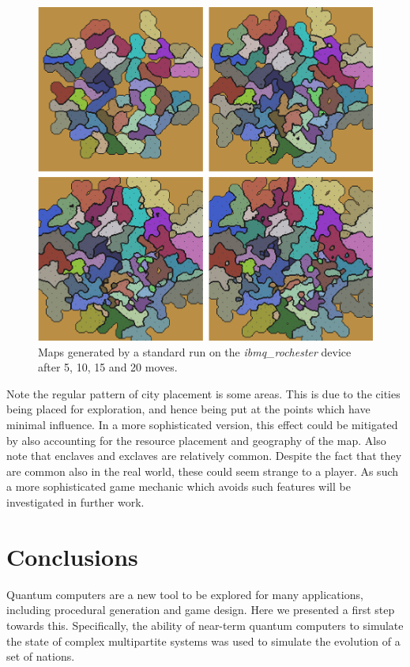 \documentclass[conference]{IEEEtran}
\begin{document}
\begin{figure}[htbp]
\begin{center}
\includegraphics[width=0.95\columnwidth]{figures/maps.png}
\caption{Maps generated by a standard run on the \textit{ibmq\_rochester} device after 5, 10, 15 and 20 moves.}
\label{maps}
\end{center}
\end{figure}

Note the regular pattern of city placement is some areas. This is due to the cities being placed for exploration, and hence being put at the points which have minimal influence. In a more sophisticated version, this effect could be mitigated by also accounting for the resource placement and geography of the map. Also note that enclaves and exclaves are relatively common. Despite the fact that they are common also in the real world, these could seem strange to a player. As such a more sophisticated game mechanic which avoids such features will be investigated in further work.

\section{Conclusions}

Quantum computers are a new tool to be explored for many applications, including procedural generation and game design. Here we presented a first step towards this. Specifically, the ability of near-term quantum computers to simulate the state of complex multipartite systems was used to simulate the evolution of a set of nations.
\end{document}
